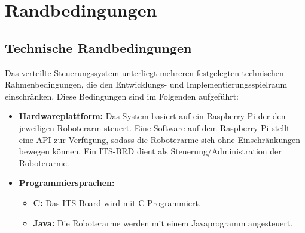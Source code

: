 

\chapter{Randbedingungen}

\section{Technische Randbedingungen}

Das verteilte Steuerungssystem unterliegt mehreren festgelegten technischen Rahmenbedingungen, die den Entwicklungs- und Implementierungsspielraum einschränken. Diese Bedingungen sind im Folgenden aufgeführt:

\begin{itemize}
    \item \textbf{Hardwareplattform:}  Das System basiert auf ein Raspberry Pi der den jeweiligen Roboterarm steuert. Eine Software auf dem Raspberry Pi stellt eine API zur Verfügung, 
    sodass die Roboterarme sich ohne Einschränkungen bewegen können. %
    Ein ITS-BRD dient als Steuerung/Administration der Roboterarme.
    
    \item \textbf{Programmiersprachen:}  
    \begin{itemize}
        \item \textbf{C:} Das ITS-Board wird mit C Programmiert. 
        \item \textbf{Java:} Die Roboterarme werden mit einem Javaprogramm angesteuert.
    \end{itemize}
    \end{itemize}

